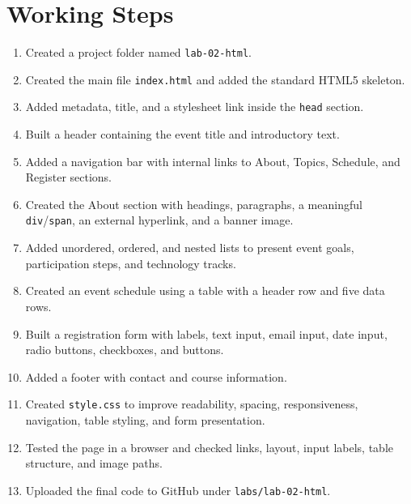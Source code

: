 \documentclass[12pt,a4paper]{article}
\begin{document}
\section{Working Steps}
\begin{enumerate}[leftmargin=1.8em]
\item Created a project folder named \texttt{lab-02-html}.
\item Created the main file \texttt{index.html} and added the standard HTML5 skeleton.
\item Added metadata, title, and a stylesheet link inside the \texttt{head} section.
\item Built a header containing the event title and introductory text.
\item Added a navigation bar with internal links to About, Topics, Schedule, and Register sections.
\item Created the About section with headings, paragraphs, a meaningful \texttt{div}/\texttt{span}, an external hyperlink, and a banner image.
\item Added unordered, ordered, and nested lists to present event goals, participation steps, and technology tracks.
\item Created an event schedule using a table with a header row and five data rows.
\item Built a registration form with labels, text input, email input, date input, radio buttons, checkboxes, and buttons.
\item Added a footer with contact and course information.
\item Created \texttt{style.css} to improve readability, spacing, responsiveness, navigation, table styling, and form presentation.
\item Tested the page in a browser and checked links, layout, input labels, table structure, and image paths.
\item Uploaded the final code to GitHub under \texttt{labs/lab-02-html}.
\end{enumerate}
\end{document}
